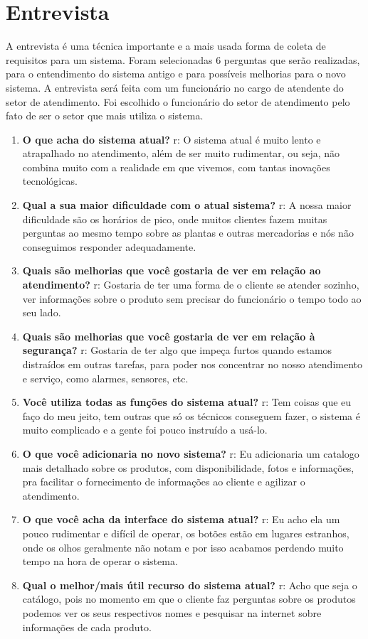 \section{Entrevista}

A entrevista é uma técnica importante e a mais usada forma de coleta de requisitos para um sistema. Foram selecionadas 6 perguntas que serão realizadas, para o entendimento do sistema antigo e para possíveis melhorias para o novo sistema. A entrevista será feita com um funcionário no cargo de atendente do setor de atendimento. Foi escolhido o funcionário do setor de atendimento pelo fato de ser o setor que mais utiliza o sistema.

\begin{enumerate}
	\item \textbf{O que acha do sistema atual?}
		\subitem r: O sistema atual é muito lento e atrapalhado no atendimento, além de ser muito rudimentar, ou seja, não combina muito com a realidade em que vivemos, com tantas inovações tecnológicas. 
	\item \textbf{Qual a sua maior dificuldade com o atual sistema?}
		\subitem r: A nossa maior dificuldade são os horários de pico, onde muitos clientes fazem muitas perguntas ao mesmo tempo sobre as plantas e outras mercadorias e nós não conseguimos responder adequadamente.
	\item \textbf{Quais são melhorias que você gostaria de ver em relação ao atendimento?}
		\subitem r: Gostaria de ter uma forma de o cliente se atender sozinho, ver informações sobre o produto sem precisar do funcionário o tempo todo ao seu lado.
	\item \textbf{Quais são melhorias que você gostaria de ver em relação à segurança?}
		\subitem r: Gostaria de ter algo que impeça furtos quando estamos distraídos em outras tarefas, para poder nos concentrar no nosso atendimento e serviço, como alarmes, sensores, etc. 
	\item \textbf{Você utiliza todas as funções do sistema atual?}
		\subitem r: Tem coisas que eu faço do meu jeito, tem outras que só os técnicos conseguem fazer, o sistema é muito complicado e a gente foi pouco instruído a usá-lo.
	\item \textbf{O que você adicionaria no novo sistema?}
		\subitem r: Eu adicionaria um catalogo mais detalhado sobre os produtos, com disponibilidade, fotos e informações, pra facilitar o fornecimento de informações ao cliente e agilizar o atendimento.
		\item \textbf{O que você acha da interface do sistema atual?}
		\subitem r: Eu acho ela um pouco rudimentar e difícil de operar, os botões estão em lugares estranhos, onde os olhos geralmente não notam e por isso acabamos perdendo muito tempo na hora de operar o sistema.
		\item \textbf{Qual o melhor/mais útil recurso do sistema atual?}
		\subitem r: Acho que seja o catálogo, pois no momento em que o cliente faz perguntas sobre os produtos podemos ver os seus respectivos nomes e pesquisar na internet sobre informações de cada produto.
\end{enumerate}

